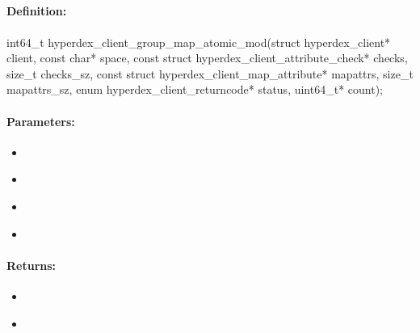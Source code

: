 \pagebreak
\subsection{}
\label{api:c:group_map_atomic_mod}


\paragraph{Definition:}
\begin{ccode}
int64_t hyperdex_client_group_map_atomic_mod(struct hyperdex_client* client,
        const char* space,
        const struct hyperdex_client_attribute_check* checks, size_t checks_sz,
        const struct hyperdex_client_map_attribute* mapattrs, size_t mapattrs_sz,
        enum hyperdex_client_returncode* status,
        uint64_t* count);
\end{ccode}

\paragraph{Parameters:}
\begin{itemize}[noitemsep]
\item {}\\

\item {}\\

\item {}\\

\item {}\\

\end{itemize}

\paragraph{Returns:}
\begin{itemize}[noitemsep]
\item {}\\

\item {}\\

\end{itemize}

